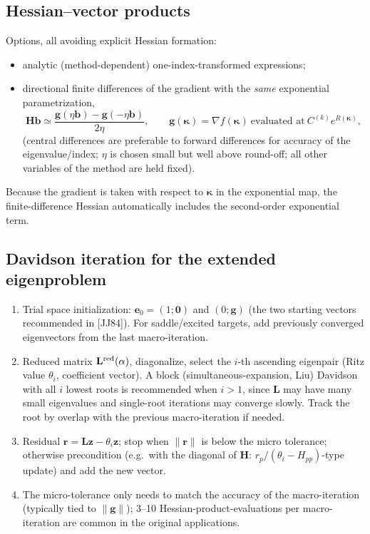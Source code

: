 \documentclass[11pt,a4paper]{article}
\newcommand{\bH}{\mathbf{H}}
\newcommand{\bL}{\mathbf{L}}
\newcommand{\bg}{\mathbf{g}}
\newcommand{\bz}{\mathbf{z}}
\newcommand{\bb}{\mathbf{b}}
\newcommand{\be}{\mathbf{e}}
\newcommand{\bk}{\boldsymbol{\kappa}}
\begin{document}
\subsection{Hessian--vector products}
Options, all avoiding explicit Hessian formation:
\begin{itemize}[nosep]
 \item analytic (method-dependent) one-index-transformed expressions;
 \item directional finite differences of the gradient with the \emph{same} exponential parametrization,
 \begin{equation}
  \bH\bb\simeq\frac{\bg(\eta\bb)-\bg(-\eta\bb)}{2\eta},\qquad \bg(\bk)=\nabla f(\bk)\ \text{evaluated at}\ C^{(k)}e^{R(\bk)},
 \end{equation}
 (central differences are preferable to forward differences for accuracy of the eigenvalue/index; $\eta$ is chosen small but well above round-off; all other variables of the method are held fixed).
\end{itemize}
Because the gradient is taken with respect to $\bk$ in the exponential map, the finite-difference Hessian automatically includes the second-order exponential term.

\subsection{Davidson iteration for the extended eigenproblem}
\begin{enumerate}[nosep]
 \item Trial space initialization: $\be_0=(1;\mathbf 0)$ and $(0;\bg)$ (the two starting vectors recommended in [JJ84]). For saddle/excited targets, add previously converged eigenvectors from the last macro-iteration.
 \item Reduced matrix $\bL^{\rm red}(\alpha)$, diagonalize, select the $i$-th ascending eigenpair (Ritz value $\theta_i$, coefficient vector). A block (simultaneous-expansion, Liu) Davidson with all $i$ lowest roots is recommended when $i>1$, since $\bL$ may have many small eigenvalues and single-root iterations may converge slowly. Track the root by overlap with the previous macro-iteration if needed.
 \item Residual $\mathbf r=\bL\bz-\theta_i\bz$; stop when $\|\mathbf r\|$ is below the micro tolerance; otherwise precondition (e.g.\ with the diagonal of $\bH$: $r_p/(\theta_i-H_{pp})$-type update) and add the new vector.
 \item The micro-tolerance only needs to match the accuracy of the macro-iteration (typically tied to $\|\bg\|$); 3--10 Hessian-product-evaluations per macro-iteration are common in the original applications.
\end{enumerate}
\end{document}
